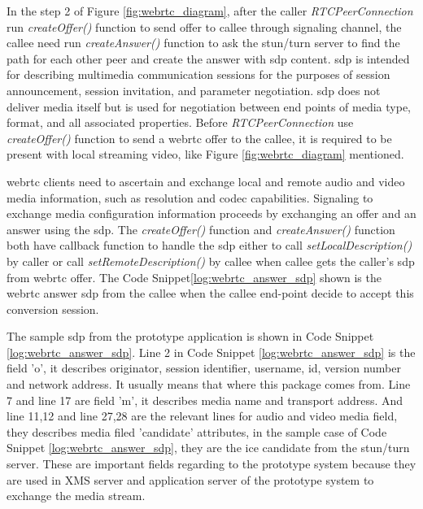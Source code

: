 \par In the step 2 of Figure \ref{fig:webrtc_diagram}, after the caller \textit{RTCPeerConnection} run \textit{createOffer()} function to send offer to callee through signaling channel, the callee need run \textit{createAnswer()} function to ask the \gls{stun}/\gls{turn} server to find the path for each other peer and create the answer with \gls{sdp} content. \gls{sdp} is intended for describing multimedia communication sessions for the purposes of session announcement, session invitation, and parameter negotiation. \gls{sdp} does not deliver media itself but is used for negotiation between end points of media type, format, and all associated properties.\cite{wiki:sdp} Before \textit{RTCPeerConnection} use \textit{createOffer()} function to send a \gls{webrtc} offer to the callee, it is required to be present with local streaming video, like Figure \ref{fig:webrtc_diagram} mentioned.

\par \gls{webrtc} clients need to ascertain and exchange local and remote audio and video media information, such as resolution and codec capabilities. Signaling to exchange media configuration information proceeds by exchanging an offer and an answer using the \gls{sdp}. The \textit{createOffer()} function and \textit{createAnswer()} function both have callback function to handle the \gls{sdp} either to call \textit{setLocalDescription()} by caller or call \textit{setRemoteDescription()} by callee when callee gets the caller's \gls{sdp} from \gls{webrtc} offer. The Code Snippet\ref{log:webrtc_answer_sdp} shown is the \gls{webrtc} answer \gls{sdp} from the callee when the callee end-point decide to accept this conversion session.

\par The sample \gls{sdp} from the prototype application is shown in Code Snippet \ref{log:webrtc_answer_sdp}. Line 2 in Code Snippet \ref{log:webrtc_answer_sdp} is the field 'o', it describes originator, session identifier, username, id, version number and network address. It usually means that where this package comes from. Line 7 and line 17 are field 'm', it describes media name and transport address. And line 11,12 and line 27,28 are the relevant lines for audio and video media field, they describes media filed 'candidate' attributes, in the sample case of Code Snippet \ref{log:webrtc_answer_sdp}, they are the \gls{ice} candidate from the \gls{stun}/\gls{turn} server. These are important fields regarding to the prototype system because they are used in XMS server and application server of the prototype system to exchange the media stream.

